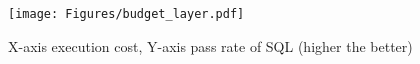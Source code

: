 {
\begin{figure}[h]
\begin{center}
\centerline{\texttt{[image: Figures/budget\_layer.pdf]}}
{
X-axis execution cost, Y-axis pass rate of SQL (higher the better)
}
\end{center}
\label{fig-layering-influence}
\end{figure}
}